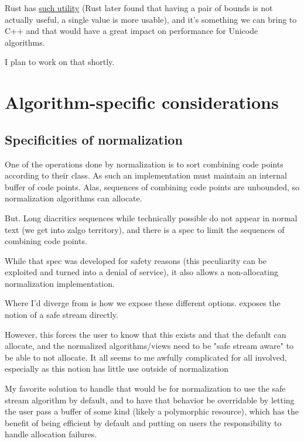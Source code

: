 \documentclass{wg21}
\begin{document}
Rust has \href{https://doc.rust-lang.org/std/iter/trait.Iterator.html#method.size_hint}{such utility} (Rust later found that having a pair of bounds is not actually useful, a single value is more usable), and it's something we can bring to C++ and that would have a great impact on performance for Unicode algorithms.

I plan to work on that shortly.

\section{Algorithm-specific considerations}

\subsection{Specificities of normalization}

One of the operations done by normalization is to sort combining code points according to their class.
As such an implementation must maintain an internal buffer of code points.
Alas, sequences of combining code points are unbounded, so normalization algorithms can allocate.

But. Long diacritics sequences while technically possible do not appear in normal text (we get into zalgo territory), and there is a spec
to limit the sequences of combining code points.

While that spec was developed for safety reasons (this peculiarity can be exploited and turned into a denial of service), it also allows a non-allocating normalization implementation.

Where I'd diverge from  is how we expose these different options.
 exposes the notion of a safe stream directly.

However, this forces the user to know that this exists and that the default can allocate, and the normalized algorithms/views need to be "safe stream aware" to be able to not allocate.
It all seems to me awfully complicated for all involved, especially as this notion has little use outside of normalization

My favorite solution to handle that would be for normalization to use the safe stream algorithm by default, and to have that behavior be overridable by letting the user
pass a buffer of some kind (likely a polymorphic resource), which has the benefit of being efficient by default and putting on users the responsibility to handle allocation failures.
\end{document}
